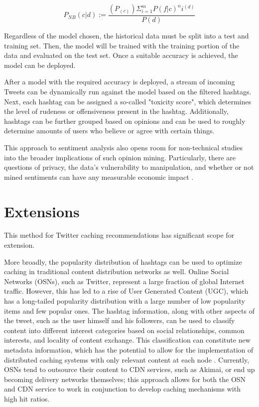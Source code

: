 \documentclass[conference]{IEEEtran}
\begin{document}
\begin{equation}
P_{NB}(c\vert d):={\frac{(P_{(c)})\Sigma_{i=1}^{m}P(f\vert c)^{n}i^{(d)}} {P(d)}}
\label{eqn: naive_bayes}
\end{equation}

Regardless of the model chosen, the historical data must be split into a test and training set. Then, the model will be trained with the training portion of the data and evaluated on the test set. Once a suitable accuracy is achieved, the model can be deployed. \par

After a model with the required accuracy is deployed, a stream of incoming Tweets can be dynamically run against the model based on the filtered hashtags. Next, each hashtag can be assigned a so-called "toxicity score", which determines the level of rudeness or offensiveness present in the hashtag. Additionally, hashtags can be further grouped based on opinions and can be used to roughly determine amounts of users who believe or agree with certain things. \par

This approach to sentiment analysis also opens room for non-technical studies into the broader implications of such opinion mining. Particularly, there are questions of privacy, the data's vulnerability to manipulation, and whether or not mined sentiments can have any measurable economic impact \cite{pang_lee_2008}. \par

\section{Extensions}
This method for Twitter caching recommendations has significant scope for extension. \par

More broadly, the popularity distribution of hashtags can be used to optimize caching in traditional content distribution networks as well. Online Social Networks (OSNs), such as Twitter, represent a large fraction of global Internet traffic. However, this has led to a rise of User Generated Content (UGC), which has  a long-tailed popularity distribution with a large number of low popularity items and few popular ones. The hashtag information, along with other aspects of the tweet, such as the user himself and his followers, can be used to classify content into different interest categories based on social relationships, common interests, and locality of content exchange. This classification can constitute new metadata information, which has the potential to allow for the implementation of distributed caching systems with only relevant content at each node \cite{6932933}. Currently, OSNs tend to outsource their content to CDN services, such as Akimai, or end up becoming delivery networks themselves; this approach allows for both the OSN and CDN service to work in conjunction to develop caching mechanisms with high hit ratios. \par
\end{document}
